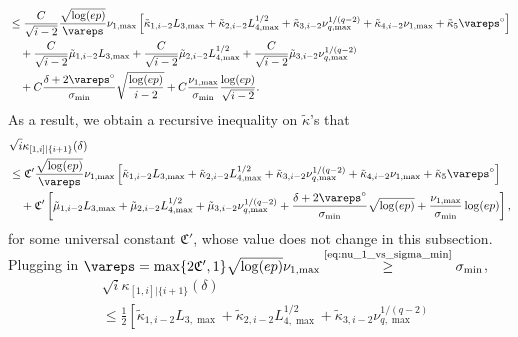 \documentclass[aos]{imsart}
\begin{document}
\begin{appendix}
\begin{equation*}
\begin{aligned}
    & \leq \frac{C}{\sqrt{i-2}} 
    \frac{\sqrt{\log(ep)}}{\vareps} \nu_{1,\max}
    \left[ 
        \tilde\kappa_{1,i-2} {L}_{3,\max}
        + \tilde\kappa_{2,i-2} {L}_{4,\max}^{1/2}
        + \tilde\kappa_{3,i-2} {\nu}_{q,\max}^{1/(q-2)}
        + \tilde\kappa_{4,i-2} \nu_{1,\max}
        + \tilde\kappa_{5} {\vareps^\circ}
    \right]
    \\
    & \quad + \frac{C}{\sqrt{i-2}} \tilde\mu_{1,i-2} {{L}_{3,\max}}
    + \frac{C}{\sqrt{i-2}} \tilde\mu_{2,i-2} {{L}_{4,\max}^{1/2}}
    + \frac{C}{\sqrt{i-2}} \tilde\mu_{3,i-2} {\nu_{q,\max}^{1/(q-2)}} \\
    & \quad + C\frac{\delta + 2\vareps^\circ}{\sigma_{\min}} \sqrt{\frac{\log(ep)}{i-2}}
    + C\frac{\nu_{1,\max}}{\sigma_{\min}} \frac{\log(ep)}{\sqrt{i-2}}.
\end{aligned}
\end{equation*}
As a result, we obtain a recursive inequality on $\tilde\kappa$'s that
\begin{equation} \label{eq:recursion_kappa_4N}
\begin{aligned}
    & \sqrt{i} \kappa_{[1,i]|\{i+1\}}(\delta) \\
    & \leq \mathfrak{C}' \frac{\sqrt{\log(ep)}}{\vareps} \nu_{1,\max}
    \left[ 
        \tilde\kappa_{1,i-2} {L}_{3,\max}
        + \tilde\kappa_{2,i-2} {L}_{4,\max}^{1/2}
        + \tilde\kappa_{3,i-2} \nu_{q,\max}^{1/(q-2)}
        + \tilde\kappa_{4,i-2} \nu_{1,\max}
        + \tilde\kappa_{5} \vareps^\circ
    \right]
    \\
    & \quad + \mathfrak{C}'  \left[ 
        \tilde\mu_{1,i-2} {L}_{3,\max}
        + \tilde\mu_{2,i-2} {L}_{4,\max}^{1/2}
        + \tilde\mu_{3,i-2} \nu_{q,\max}^{1/(q-2)}
        + \frac{\delta + 2\vareps^\circ}{\sigma_{\min}} \sqrt{\log(ep)}
        + \frac{\nu_{1,\max}}{\sigma_{\min}} \log(ep)
    \right],
\end{aligned}
\end{equation}
for some universal constant $\mathfrak{C}'$, whose value does not change in this subsection.
Plugging in $\vareps = \max\{2 \mathfrak{C}', 1\} \sqrt{\log(ep)} {\nu}_{1,\max} \overset{\text{\cref{eq:nu_1_vs_sigma_min}}}{\geq} \sigma_{\min}$,
\begin{equation*}
\begin{aligned}
    & \sqrt{i} \kappa_{[1,i]|\{i+1\}}(\delta) \\
    & \leq \frac{1}{2}
    \left[ 
        \tilde\kappa_{1,i-2} {L}_{3,\max}
        + \tilde\kappa_{2,i-2} {L}_{4,\max}^{1/2}
        + \tilde\kappa_{3,i-2} \nu_{q,\max}^{1/(q-2)}

\end{aligned}
\end{equation*}
\end{appendix}
\end{document}
